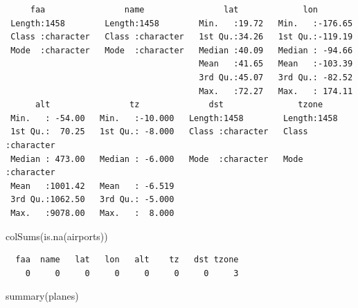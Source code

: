 \documentclass[
  10pt,
  letterpaper,
  DIV=11,
  numbers=noendperiod]{scrartcl}
\newenvironment{Shaded}{\begin{snugshade}}{\end{snugshade}}
\newcommand{\FunctionTok}[1]{\textcolor[rgb]{0.28,0.35,0.67}{#1}}
\newcommand{\NormalTok}[1]{\textcolor[rgb]{0.00,0.23,0.31}{#1}}
\begin{document}
\begin{verbatim}
     faa                name                lat             lon         
 Length:1458        Length:1458        Min.   :19.72   Min.   :-176.65  
 Class :character   Class :character   1st Qu.:34.26   1st Qu.:-119.19  
 Mode  :character   Mode  :character   Median :40.09   Median : -94.66  
                                       Mean   :41.65   Mean   :-103.39  
                                       3rd Qu.:45.07   3rd Qu.: -82.52  
                                       Max.   :72.27   Max.   : 174.11  
      alt                tz              dst               tzone          
 Min.   : -54.00   Min.   :-10.000   Length:1458        Length:1458       
 1st Qu.:  70.25   1st Qu.: -8.000   Class :character   Class :character  
 Median : 473.00   Median : -6.000   Mode  :character   Mode  :character  
 Mean   :1001.42   Mean   : -6.519                                        
 3rd Qu.:1062.50   3rd Qu.: -5.000                                        
 Max.   :9078.00   Max.   :  8.000                                        
\end{verbatim}

\begin{Shaded}
\begin{Highlighting}[numbers=left,,]
\FunctionTok{colSums}\NormalTok{(}\FunctionTok{is.na}\NormalTok{(airports))}
\end{Highlighting}
\end{Shaded}

\begin{verbatim}
  faa  name   lat   lon   alt    tz   dst tzone 
    0     0     0     0     0     0     0     3 
\end{verbatim}

\begin{Shaded}
\begin{Highlighting}[numbers=left,,]
\FunctionTok{summary}\NormalTok{(planes)}
\end{Highlighting}
\end{Shaded}
\end{document}
